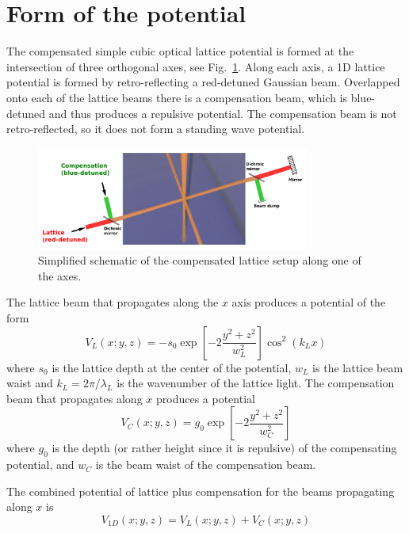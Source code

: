 \section{Form of the potential}  

The compensated simple cubic optical lattice potential is formed at the
intersection of three orthogonal axes, see
Fig.~\ref{fig:compensated_lattice_simple_schematic}.  Along each axis, a 1D
lattice potential is formed by retro-reflecting a red-detuned Gaussian beam.
Overlapped onto each of the lattice beams there is a compensation beam, which
is blue-detuned and thus produces a repulsive potential.   The compensation
beam is not retro-reflected, so it does not form a standing wave potential.  
\begin{figure}
    \centering
\includegraphics[width=0.8\textwidth]{../figures/lda_evap/compensated_lattice_simple_schematic.png}
\caption{\small Simplified schematic of the compensated lattice setup along one of the
axes.}\label{fig:compensated_lattice_simple_schematic}
\end{figure}

The lattice beam that propagates along the $x$ axis produces a potential of the
form 
\begin{equation}
  V_{L}( x; y,z)  = 
  - s_{0} \exp\left[- 2 \frac{ y^{2} + z^{2} }{w_{L}^{2}} \right]
  \cos^{2}( k_{L} x ) 
\end{equation}
where $s_{0}$ is the lattice depth at the center of the potential,  $w_{L}$ is
the lattice beam waist and $k_{L} = 2\pi/\lambda_{L}$ is the wavenumber of the
lattice light.
The compensation beam that propagates along $x$ produces a potential  
\begin{equation}
  V_{C}( x; y, z)  = 
   g_{0}  \exp\left[ -2 \frac{ y^{2} + z^{2} }{w_{C}^{2}} \right] 
\label{eq:Vcomp}
\end{equation}
where  $g_{0}$ is the depth (or rather height since it is repulsive) of the
compensating potential, and $w_{C}$ is the beam waist of the compensation beam.

The combined potential of lattice plus compensation for the beams propagating
along $x$ is 
\begin{equation}
  V_{1D}( x; y ,z ) = V_{L}(x; y,z) + V_{C}(x; y, z)
\end{equation}

